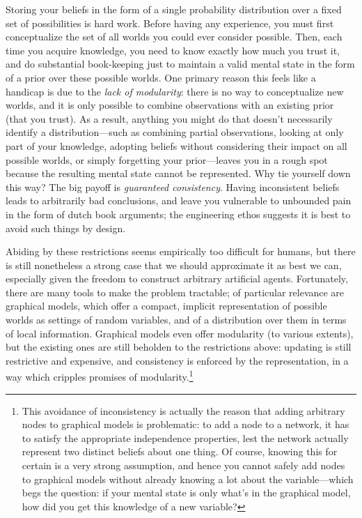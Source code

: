\documentclass{article}
\newcommand\changed[1]{{\color{note-fg} #1}}
\begin{document}
	
	\changed{Storing your beliefs in the form of a single probability distribution over a fixed set of possibilities is hard work. Before having any experience,} you must first conceptualize the set of all worlds you could ever consider possible. 
	Then, each time you acquire knowledge, you need to know exactly how much you trust it, and do substantial book-keeping just to maintain a valid mental state in the form of a prior over these possible worlds.
	\changed{One primary reason this feels like a handicap is due to the} \textit{lack of modularity}: there is no way to conceptualize new worlds, and it is only possible to combine observations with an existing prior (that you trust). \changed{As a result, anything you might do that doesn't necessarily identify a distribution---such as combining partial observations, looking at only part of your knowledge, adopting beliefs without considering their impact on all possible worlds, or simply forgetting your prior---leaves you in a rough spot because the resulting mental state cannot be represented}.
	Why tie yourself down this way? The big payoff is \textit{guaranteed consistency}. Having inconsistent beliefs leads to arbitrarily bad conclusions, and leave you vulnerable to unbounded pain in the form of dutch book arguments; the engineering ethos suggests it is best to avoid such things by design.
	
	
	Abiding by these restrictions seems empirically too difficult for humans, \changed{but there is still nonetheless a strong case that we should} approximate it as best we can, especially given the freedom to construct arbitrary artificial agents. Fortunately, there are many tools to make the problem tractable; of particular relevance are graphical models, which offer a compact, implicit representation of possible worlds as settings of random variables, and of a distribution over them in terms of local information. Graphical models even offer modularity (to various extents), but the existing ones are still beholden to the restrictions above: updating is still restrictive and expensive, and consistency is enforced by the representation, in a way which cripples promises of modularity.\footnote{This avoidance of inconsistency is actually the reason that adding arbitrary nodes to graphical models is problematic: to add a node to a network, it has to satisfy the appropriate independence properties, lest the network actually represent two distinct beliefs about one thing. Of course, knowing this for certain is a very strong assumption, and hence you cannot safely add nodes to graphical models without already knowing a lot about the variable---which begs the question: if your mental state is only what's in the graphical model, how did you get this knowledge of a new variable?}
	
\end{document}
